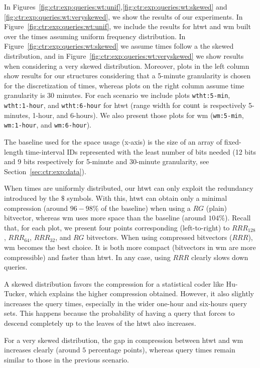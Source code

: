 	In Figures~\ref{fig:ctr:exp:queries:wt:unif},\ref{fig:ctr:exp:queries:wt:skewed} and \ref{fig:ctr:exp:queries:wt:veryskewed}, we show the results of our experiments. In Figure~\ref{fig:ctr:exp:queries:wt:unif}, we 
	include the results for \gls{htwt} and \gls{wm} built over the times assuming uniform frequency distribution.
	In Figure~\ref{fig:ctr:exp:queries:wt:skewed} we assume times follow a the skewed distribution, and in Figure~\ref{fig:ctr:exp:queries:wt:veryskewed} we show
	results when considering a very skewed distribution. Moreover, plots in the left column show results
	for our structures considering that a 5-minute granularity is chosen for the discretization of times, whereas
	plots on the right column assume time granularity is 30 minutes. For each scenario we include plots
	\texttt{wtht:5-min}, \texttt{wtht:1-hour}, and \texttt{wtht:6-hour} for \gls{htwt} (range width for $\operatorname{count}$ is respectively
	5-minutes, 1-hour, and 6-hours). We also present those plots for \gls{wm} (\texttt{wm:5-min}, \texttt{wm:1-hour}, and \texttt{wm:6-hour}).

	The baseline used for the space usage (x-axis) is the size of an array of
	fixed-length time-interval IDs represented with the least number of bits needed (12 bits and 9 bits
	respectively for 5-minute and 30-minute granularity, see Section~\ref{sec:ctr:exp:data}).
	\medskip

	When times are uniformly distributed, our \gls{htwt} can only exploit the redundancy introduced by
	the $\$$ symbols. With this, \gls{htwt} can obtain only a minimal compression (around $96-98\%$ of the baseline)
	when using a $RG$ (plain) bitvector, whereas \gls{wm} uses more space than the baseline (around $104\%$).
	Recall that, for each plot, we present four points corresponding (left-to-right) 
	to $RRR_{128}$, $RRR_{64}$, $RRR_{32}$, and $RG$ bitvectors.
	When using compressed  bitvectors ($RRR$), \gls{wm} becomes the best choice. It is both more compact 
	(bitvectors in \gls{wm} are more compressible) and faster than \gls{htwt}. 
	In any case, using $RRR$ clearly slows down queries.

	A skewed distribution favors the compression for a statistical coder like Hu-Tucker,
	which explains the higher compression obtained. However,
	it also slightly increases the query times, especially in the wider
	one-hour and six-hours query sets. This happens because the probability of having a query 
	that forces to descend completely up to the leaves of the \gls{htwt} also increases.

	For a very skewed distribution, the gap in compression between \gls{htwt} and \gls{wm} increases clearly (around 
	$5$ percentage points), whereas query times remain similar to those in the previous scenario.

